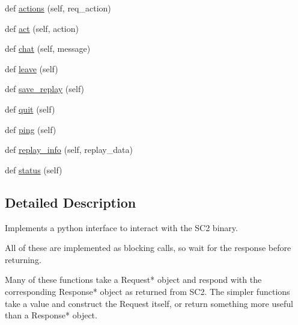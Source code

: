 \begin{DoxyCompactItemize}
\item 
def \mbox{\hyperlink{classpysc2_1_1lib_1_1remote__controller_1_1_remote_controller_a04e94f4b848edc9217a223e55706f42a}{actions}} (self, req\+\_\+action)
\item 
def \mbox{\hyperlink{classpysc2_1_1lib_1_1remote__controller_1_1_remote_controller_a9a583874ce739176d1b1dfd64d5b66d0}{act}} (self, action)
\item 
def \mbox{\hyperlink{classpysc2_1_1lib_1_1remote__controller_1_1_remote_controller_a6436284406688055f28602f97700b9c9}{chat}} (self, message)
\item 
def \mbox{\hyperlink{classpysc2_1_1lib_1_1remote__controller_1_1_remote_controller_a934b37c346a993c3a0e80027bc22be6f}{leave}} (self)
\item 
def \mbox{\hyperlink{classpysc2_1_1lib_1_1remote__controller_1_1_remote_controller_a9383a87328923ffa817caaee6ef043d8}{save\+\_\+replay}} (self)
\item 
def \mbox{\hyperlink{classpysc2_1_1lib_1_1remote__controller_1_1_remote_controller_a47d4ab019c27ba0bdcf373c0529654b5}{quit}} (self)
\item 
def \mbox{\hyperlink{classpysc2_1_1lib_1_1remote__controller_1_1_remote_controller_a2e120fcac63f5c2c2186f517876bb277}{ping}} (self)
\item 
def \mbox{\hyperlink{classpysc2_1_1lib_1_1remote__controller_1_1_remote_controller_a7a905bd345e001db1c5698646d97b476}{replay\+\_\+info}} (self, replay\+\_\+data)
\item 
def \mbox{\hyperlink{classpysc2_1_1lib_1_1remote__controller_1_1_remote_controller_aa4765773f0754d885cc0f74202ee3210}{status}} (self)
\end{DoxyCompactItemize}


\subsection{Detailed Description}
\begin{DoxyVerb}Implements a python interface to interact with the SC2 binary.

All of these are implemented as blocking calls, so wait for the response
before returning.

Many of these functions take a Request* object and respond with the
corresponding Response* object as returned from SC2. The simpler functions
take a value and construct the Request itself, or return something more useful
than a Response* object.
\end{DoxyVerb}
 

